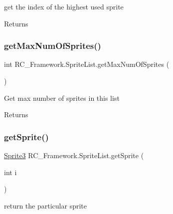 get the index of the highest used sprite 

\begin{DoxyReturn}{Returns}

\end{DoxyReturn}
\mbox{\label{class_r_c___framework_1_1_sprite_list_a093cf170b2802f89be43bf86ed81662e}} 
\subsubsection{\texorpdfstring{get\+Max\+Num\+Of\+Sprites()}{getMaxNumOfSprites()}}
{\footnotesize\ttfamily int R\+C\+\_\+\+Framework.\+Sprite\+List.\+get\+Max\+Num\+Of\+Sprites (\begin{DoxyParamCaption}{ }\end{DoxyParamCaption})}



Get max number of sprites in this list 

\begin{DoxyReturn}{Returns}

\end{DoxyReturn}
\mbox{\label{class_r_c___framework_1_1_sprite_list_a430b89d680a7267307b61d7cb81d948d}} 
\subsubsection{\texorpdfstring{get\+Sprite()}{getSprite()}}
{\footnotesize\ttfamily \mbox{\hyperlink{class_r_c___framework_1_1_sprite3}{Sprite3}} R\+C\+\_\+\+Framework.\+Sprite\+List.\+get\+Sprite (\begin{DoxyParamCaption}\item[{int}]{i }\end{DoxyParamCaption})}



return the particular sprite 


